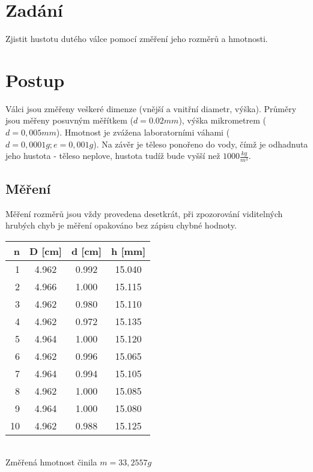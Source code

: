 \documentclass[czech,11pt,a4paper]{article}
\begin{document}
	
	\section{Zadání}
	Zjistit hustotu dutého válce pomocí změření jeho rozměrů a hmotnosti.
	
	\section{Postup}
	Válci jsou změřeny veškeré dimenze (vnější a vnitřní diametr, výška). Průměry jsou měřeny posuvným měřítkem ($d = 0.02mm$), výška mikrometrem ($d = 0,005mm$). Hmotnost je zvážena laboratorními váhami ($ d = 0,0001g ; e = 0,001g$). Na závěr je těleso ponořeno do vody, čímž je odhadnuta jeho hustota - těleso neplove, hustota tudíž bude vyšší než $1000 \frac{kg}{m^3}$.
	
	
	\subsection{Měření}
	Měření rozměrů jsou vždy provedena desetkrát, při zpozorování viditelných hrubých chyb je měření opakováno bez zápisu chybné hodnoty. 
	\\
	
	\quad \quad \quad\quad\quad \quad\quad\quad\quad\quad\quad\quad\quad \begin{tabular}{||r|c|c|c||}
		\hline
		n & D [cm] & d [cm] & h [mm] \\
		\hline
		1 & 4.962 & 0.992 & 15.040 \\
		\hline
		2 & 4.966 & 1.000 &15.115\\
		\hline
		3 & 4.962 &0.980 &15.110 \\
		\hline
		4 & 4.962 &0.972 &15.135\\
		\hline
		5 &  4.964 &1.000 &15.120\\
		\hline
		6 &  4.962 & 0.996&15.065\\
		\hline 
		7 &  4.964 & 0.994&15.105\\
		\hline
		8 &  4.962 &1.000 &15.085\\
		\hline
		9 &  4.964 & 1.000&15.080\\
		\hline
		10 &  4.962 & 0.988&15.125\\
		\hline
	\end{tabular} \\
	

\quad \quad \quad\quad\quad \quad\quad\quad\quad\quad\quad\quad Změřená hmotnost činila $m = 33,2557g$
	
\end{document}
